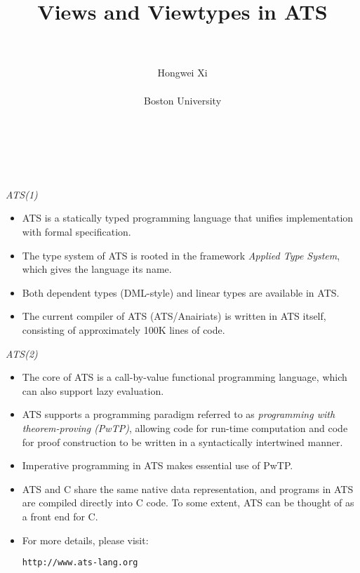 \documentclass[pdf]{prosper}
\title{\huge\bf Views and Viewtypes in ATS}
\author{~\\~\\
{\large Hongwei Xi} \\~\\
{\large Boston University} \\~\\~\\~\\
\institution{Work partly funded by NSF}}
\begin{document}
\maketitle
\begin{slide}{\em ATS(1)}
\begin{itemize}
\item
ATS is a statically typed programming language that unifies implementation
with formal specification.
\item
The type system of ATS is rooted in the framework {\em Applied Type System},
which gives the language its name.
\item
Both dependent types (DML-style) and linear types are available in ATS.
\item
The current compiler of ATS (ATS/Anairiats) is written in ATS itself,
consisting of approximately 100K lines of code.
\end{itemize}
\end{slide}
\begin{slide}{\em ATS(2)}
\begin{itemize}
\item
The core of ATS is a call-by-value functional programming language, which
can also support lazy evaluation.
\item
ATS supports a programming paradigm referred to as {\em programming with
theorem-proving (PwTP)}, allowing code for run-time computation and
code for proof construction to be written in a syntactically intertwined
manner.
\item
Imperative programming in ATS makes essential use of PwTP.
\item
ATS and C share the same native data representation, and
programs in ATS are compiled directly into C code. To some extent, ATS
can be thought of as a front end for C.
\item
For more details, please visit:
\begin{center}
\texttt{http://www.ats-lang.org}
\end{center}
\end{itemize}
\end{slide}
\def\ATS{\mbox{$\cal A\kern-1.5pt T\kern-3pt S$}}
\end{document}
